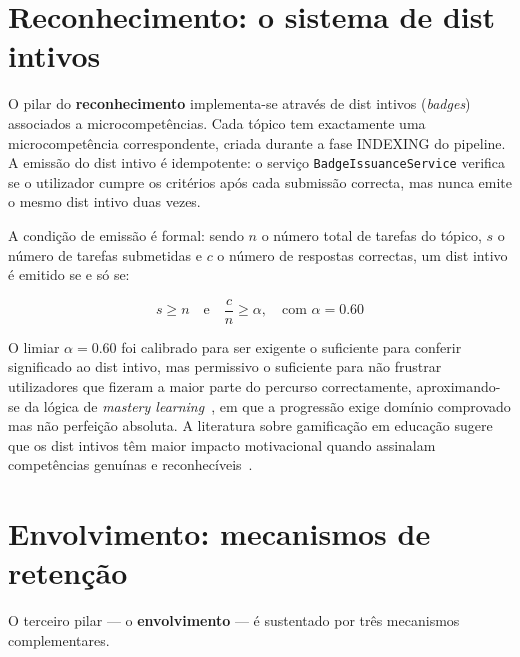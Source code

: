 \section{Reconhecimento: o sistema de dist intivos}
\label{sec:badges}

O pilar do \textbf{reconhecimento} implementa-se atrav\'es de dist intivos
(\emph{badges}) associados a microcompet\^encias. Cada t\'opico tem
exactamente uma microcompet\^encia correspondente, criada durante a fase
INDEXING do pipeline. A emiss\~ao do dist intivo \'e idempotente: o
servi\c{c}o \texttt{BadgeIssuanceService} verifica se o utilizador cumpre
os crit\'erios ap\'os cada submiss\~ao correcta, mas nunca emite o mesmo
dist intivo duas vezes.

A condi\c{c}\~ao de emiss\~ao \'e formal: sendo $n$ o n\'umero total de
tarefas do t\'opico, $s$ o n\'umero de tarefas submetidas e $c$ o n\'umero
de respostas correctas, um dist intivo \'e emitido se e s\'o se:

\begin{equation}
	s \geq n \quad \text{e} \quad \frac{c}{n} \geq \alpha,\quad \text{com } \alpha = 0.60
	\label{eq:badge}
\end{equation}

O limiar $\alpha = 0.60$ foi calibrado para ser exigente o suficiente para
conferir significado ao dist intivo, mas permissivo o suficiente para n\~ao
frustrar utilizadores que fizeram a maior parte do percurso correctamente,
aproximando-se da l\'ogica de \emph{mastery learning}~\cite{bloom1968learning},
em que a progress\~ao exige dom\'inio comprovado mas n\~ao perfei\c{c}\~ao
absoluta. A literatura sobre gamifica\c{c}\~ao em educa\c{c}\~ao sugere que
os dist intivos t\^em maior impacto motivacional quando assinalam
compet\^encias genu\'inas e reconhec\'iveis~\cite{ott2019gamification}.

\section{Envolvimento: mecanismos de reten\c{c}\~ao}
\label{sec:envolvimento}

O terceiro pilar --- o \textbf{envolvimento} --- \'e sustentado por tr\^es
mecanismos complementares.

